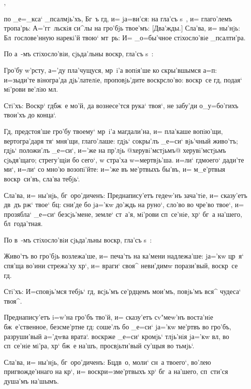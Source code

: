 ,

по _е=_кса` _псалмjь'хъ, Бг~ъ гд, и= jа=ви'ся: на 
гла'съ s~, и= глаго'лемъ тропа'рь: А='гг~льскiя си^лы на 
гро'бjь твое'мъ: [Два'жды.] Сла'ва, и= ны'нjь: 
Бл~гослове'нную нарекi'й твою` мт~рь: И= _о=бы'чное 
стiхосло'вiе _псалти'ра.

По а~-мъ стiхосло'вiи, сjьда'льны воскр, гла'съ 
s~: 

Гро'бу w'рсту, а='ду пла'чущуся, мр~i'а вопiя'ше 
ко скры'вшымся а=п: и=зыди'те вiногра'да 
дjь'лателiе, проповjь'дите воскр сло'во: воскр~се 
гд, подая` мi'рови ве'лiю мл.

Стi'хъ: Воскр` гд бж~е мо'й, да вознесе'тся 
рука` твоя`, не забу'ди о_у=бо'гихъ твои'хъ до конца`.

Гд, предстоя'ше гро'бу твоему` мр~i'а магдали'на, 
и= пла'каше вопiю'щи, вертогра'даря тя` мня'щи, 
глаго'лаше: гдjь` сокры'лъ _е=си` вjь'чный живо'тъ; гдjь` 
положи'лъ _е=си`, и='же на пр'лjь @херувi'мстjьмъ@ 
{херувi'мстjьмъ сjьдя'щаго}; стрегу'щiи бо сего`, w\т 
стра'ха w=мертвjь'ша. и=ли` гд моего` дади'те ми`, 
и=ли` со мно'ю возопi'йте: и='же въ ме'ртвыхъ бы'въ, и= 
м_е'ртвыя воскр~си'въ, сла'ва тебjь`.

Сла'ва, и= ны'нjь, бг~оро'диченъ: Преднапису'етъ 
гедеw'нъ зача'тiе, и= сказу'етъ дв~дъ рж` твое` 
бц: сни'де бо jа='кw до'ждь на руно`, сло'во во чре'во 
твое`, и= прозябла` _е=си` без\ъ сjь'мене, земле` ст~а'я, 
мi'рови сп~се'нiе, хр` бг~а на'шего, бл~года'тная.

По в~-мъ стiхосло'вiи сjьда'льны воскр, гла'съ s~: 

Живо'тъ во гро'бjь возлежа'ше, и= печа'ть на ка'мени 
надлежа'ше: jа='кw цр~я` спя'ща во'ини стрежа'ху хр`, 
и= враги` своя^ неви'димw порази'вый, воскр~се гд.

Стi'хъ: И=сповjь'мся тебjь` гд, всjь'мъ се'рдцемъ 
мои'мъ, повjь'мъ вся^ чудеса` твоя^.

Преднапису'етъ i=w'на гро'бъ тво'й, и= сказу'етъ 
сv"меw'нъ воста'нiе бж~е'ственное, безсме'ртне гд: 
соше'лъ бо _е=си` jа='кw ме'ртвъ во гро'бъ, разруши'вый 
а='дwва врата`. воскр же _е=си` кромjь` тлjь'нiя 
jа='кw вл, во сп~се'нiе мi'ра, хр` бж~е на'шъ, 
просвjьти'вый су'щыя во тьмjь`.

Сла'ва, и= ны'нjь, бг~оро'диченъ: Бц дв~о, моли` 
сн~а твоего`, во'лею пригвожде'ннаго на кр`, и= 
воскр и=з\ъ ме'ртвыхъ хр` бг~а на'шего, 
сп~сти'ся душа'мъ на'шымъ.

